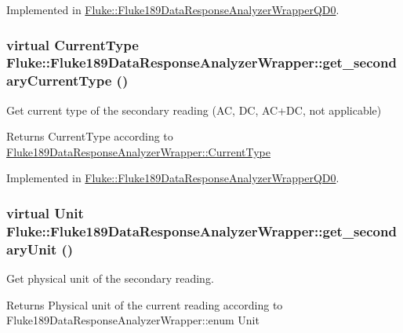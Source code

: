 Implemented in \hyperlink{classFluke_1_1Fluke189DataResponseAnalyzerWrapperQD0_a72e91f8c908b7fa8ce541308a53ff696}{Fluke::Fluke189DataResponseAnalyzerWrapperQD0}.\hypertarget{classFluke_1_1Fluke189DataResponseAnalyzerWrapper_a21a39a54587e31af04c931b46aa11806}{
\subsubsection[{get\_\-secondaryCurrentType}]{\setlength{\rightskip}{0pt plus 5cm}virtual {\bf CurrentType} Fluke::Fluke189DataResponseAnalyzerWrapper::get\_\-secondaryCurrentType ()}}
\label{classFluke_1_1Fluke189DataResponseAnalyzerWrapper_a21a39a54587e31af04c931b46aa11806}
Get current type of the secondary reading (AC, DC, AC+DC, not applicable) \begin{DoxyReturn}{Returns}
CurrentType according to \hyperlink{classFluke_1_1Fluke189DataResponseAnalyzerWrapper_afef24496da239e3613c40ad3582d7adc}{Fluke189DataResponseAnalyzerWrapper::CurrentType} 
\end{DoxyReturn}


Implemented in \hyperlink{classFluke_1_1Fluke189DataResponseAnalyzerWrapperQD0_aa46ac22750b412df37ae24db84fab138}{Fluke::Fluke189DataResponseAnalyzerWrapperQD0}.\hypertarget{classFluke_1_1Fluke189DataResponseAnalyzerWrapper_a8c24a1f3d5abae862ffa06a3a7ac44f1}{
\subsubsection[{get\_\-secondaryUnit}]{\setlength{\rightskip}{0pt plus 5cm}virtual {\bf Unit} Fluke::Fluke189DataResponseAnalyzerWrapper::get\_\-secondaryUnit ()}}
\label{classFluke_1_1Fluke189DataResponseAnalyzerWrapper_a8c24a1f3d5abae862ffa06a3a7ac44f1}
Get physical unit of the secondary reading. \begin{DoxyReturn}{Returns}
Physical unit of the current reading according to Fluke189DataResponseAnalyzerWrapper::enum Unit 
\end{DoxyReturn}



